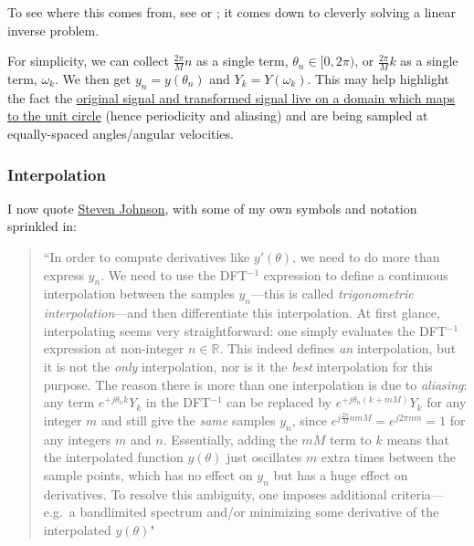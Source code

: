 \documentclass[10pt]{article}
\begin{document}
To see where this comes from, see \cite{oppenheim} or \cite{bretherton}; it comes down to cleverly solving a linear inverse problem.\newline

For simplicity, we can collect $\frac{2\pi}{M}n$ as a single term, $\theta_n \in [0, 2\pi)$, or $\frac{2\pi}{M}k$ as a single term, $\omega_k$. We then get $y_n = y(\theta_n)$ and $Y_k = Y(\omega_k)$. This may help highlight the fact the \href{https://dsp.stackexchange.com/a/18931/40873}{original signal and transformed signal live on a domain which maps to the unit circle}\cite{bristow} (hence periodicity and aliasing) and are being sampled at equally-spaced angles/angular velocities.

\subsubsection{Interpolation}

I now quote \href{https://math.mit.edu/~stevenj/fft-deriv.pdf}{Steven Johnson}\cite{johnson}, with some of my own symbols and notation sprinkled in:

\begin{quotation}\label{bandlimited}
``In order to compute derivatives like $y'(\theta)$, we need to do more than express $y_n$. We need to use the DFT$^{-1}$ expression to define a continuous interpolation between the samples $y_n$---this is called \textit{trigonometric interpolation}---and then differentiate this interpolation. At first glance, interpolating seems very straightforward: one simply evaluates the DFT$^{-1}$ expression at non-integer $n \in \mathbb{R}$. This indeed defines \textit{an} interpolation, but it is not the \textit{only} interpolation, nor is it the \textit{best} interpolation for this purpose. The reason there is more than one interpolation is due to \textit{aliasing}: any term $e^{+j \theta_n k} Y_k$ in the DFT$^{-1}$ can be replaced by $e^{+j \theta_n (k + mM)} Y_k$ for any integer $m$ and still give the \textit{same} samples $y_n$, since $e^{j \frac{2\pi}{M} nmM} = e^{j2\pi nm} = 1$ for any integers $m$ and $n$. Essentially, adding the $mM$ term to $k$ means that the interpolated function $y(\theta)$ just oscillates $m$ extra times between the sample points, which has no effect on $y_n$ but has a huge effect on derivatives. To resolve this ambiguity, one imposes additional criteria---e.g.~a bandlimited spectrum and/or minimizing some derivative of the interpolated $y(\theta)$"
\end{quotation}
\end{document}

